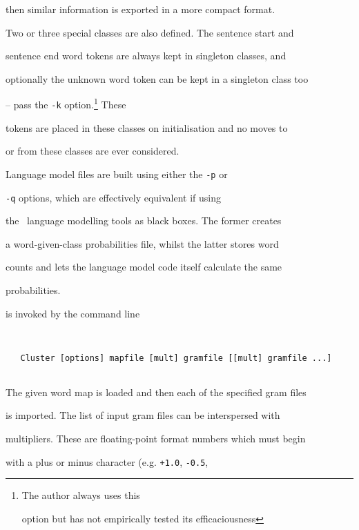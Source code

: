 then similar information is exported in a more compact format.





Two or three special classes are also defined.  The sentence start and


sentence end word tokens are always kept in singleton classes, and


optionally the unknown word token can be kept in a singleton class too


-- pass the \texttt{-k} option.\footnote{The author always uses this


option but has not empirically tested its efficaciousness} These


tokens are placed in these classes on initialisation and no moves to


or from these classes are ever considered.





Language model files are built using either the \texttt{-p} or


\texttt{-q} options, which are effectively equivalent if using


the \HTK\ language modelling tools as black boxes.  The former creates


a word-given-class probabilities file, whilst the latter stores word


counts and lets the language model code itself calculate the same


probabilities.










 is invoked by the command line


\begin{verbatim}


   Cluster [options] mapfile [mult] gramfile [[mult] gramfile ...]


\end{verbatim}


The given word map is loaded and then each of the specified gram files


is imported.  The list of input gram files can be interspersed with


multipliers. These are floating-point format numbers which must begin


with a plus or minus character (e.g. \texttt{+1.0}, \texttt{-0.5},


